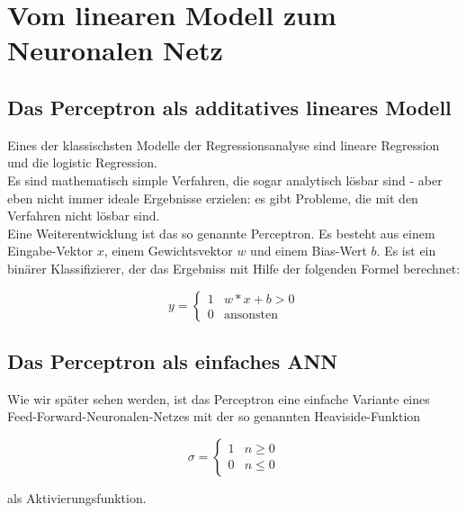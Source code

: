 ﻿\section{Vom linearen Modell zum Neuronalen Netz}

\subsection{Das Perceptron als additatives lineares Modell}
Eines der klassischsten Modelle der Regressionsanalyse sind lineare Regression und die logistic Regression. \\

Es sind mathematisch simple Verfahren, die sogar analytisch lösbar sind - aber eben nicht immer ideale Ergebnisse erzielen: es gibt Probleme, die mit den Verfahren nicht lösbar sind. 
\\

Eine Weiterentwicklung ist das so genannte Perceptron.
Es besteht aus einem Eingabe-Vektor $x$, einem Gewichtsvektor $w$ und einem Bias-Wert $b$. Es ist ein binärer Klassifizierer, der das Ergebniss mit Hilfe der folgenden Formel berechnet:

\begin{equation}
    y = \begin{cases}
               1               & w * x + b > 0\\
               0               & \text{ansonsten}
           \end{cases}
\end{equation}


\subsection{Das Perceptron als einfaches ANN}

Wie wir später sehen werden, ist das Perceptron eine einfache Variante eines Feed-Forward-Neuronalen-Netzes mit der so genannten Heaviside-Funktion

\begin{equation}
    \sigma = \begin{cases}
               1               & n \geq 0\\
               0               & n \leq 0
           \end{cases}
\end{equation}

als Aktivierungsfunktion.\\

